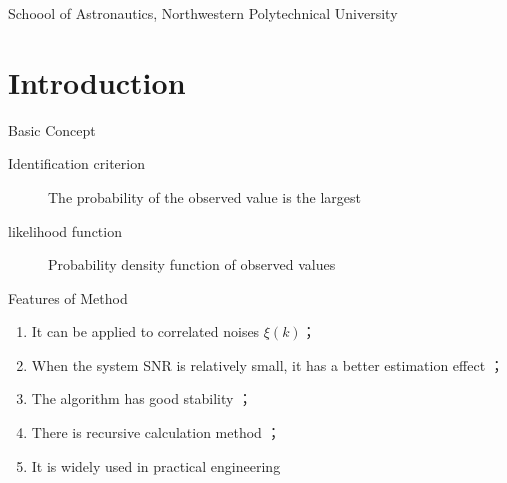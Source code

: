 
\newcommand{\vect}[1]{\boldsymbol{#1}}

\def\lecturename{System Identification}

\title{\insertlecture}

\author{Xing Chao}

\institute
{
Schoool of Astronautics, Northwestern Polytechnical University
}


\subtitle{}
\date{2017}



\begin{frame}
  \maketitle
\end{frame}


\section{Introduction}

\begin{frame}{Basic Concept}
\begin{description}
\item[ Identification criterion ]   The probability of the observed value is the largest  
\item[ likelihood function ]  Probability density function of observed values 
\end{description}
\end{frame}

\begin{frame}{Features of Method}
\begin{enumerate}
\item  It can be applied to correlated noises $\xi(k)$；
\item  When the system SNR is relatively small, it has a better estimation effect ；
\item  The algorithm has good stability ；
\item  There is recursive calculation method ；
\item  It is widely used in practical engineering 
\end{enumerate}
\end{frame}

